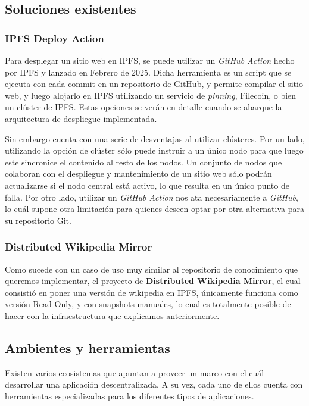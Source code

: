 \subsection{Soluciones existentes}


\subsubsection{IPFS Deploy Action}
Para desplegar un sitio web en IPFS, se puede utilizar un \textit{GitHub Action} hecho por IPFS y lanzado en Febrero de 2025. Dicha herramienta es un script que se ejecuta con cada commit en un repositorio de GitHub, y permite compilar el sitio web, y luego alojarlo en IPFS utilizando un servicio de \textit{pinning}, Filecoin, o bien un clúster de IPFS. Estas opciones se verán en detalle cuando se abarque la arquitectura de despliegue implementada.

Sin embargo cuenta con una serie de desventajas al utilizar clústeres. Por un lado, utilizando la opción de clúster sólo puede instruir a un único nodo para que luego este sincronice el contenido al resto de los nodos. Un conjunto de nodos que colaboran con el despliegue y mantenimiento de un sitio web sólo podrán actualizarse si el nodo central está activo, lo que resulta en un único punto de falla. Por otro lado, utilizar un \textit{GitHub Action} nos ata necesariamente a \textit{GitHub}, lo cuál supone otra limitación para quienes deseen optar por otra alternativa para su repositorio Git.

\subsubsection{Distributed Wikipedia Mirror}
Como sucede con un caso de uso muy similar al repositorio de conocimiento que queremos implementar, el proyecto de \textbf{Distributed Wikipedia Mirror}\cite{distributed-wikipedia-mirror}, el cual consistió en poner una versión de wikipedia en IPFS, únicamente funciona como versión Read-Only, y con snapshots manuales, lo cual es totalmente posible de hacer con la infraestructura que explicamos anteriormente.

\subsection{Ambientes y herramientas}
Existen varios ecosistemas que apuntan a proveer un marco con el cuál desarrollar una aplicación descentralizada. A su vez, cada uno de ellos cuenta con herramientas especializadas para los diferentes tipos de aplicaciones.

